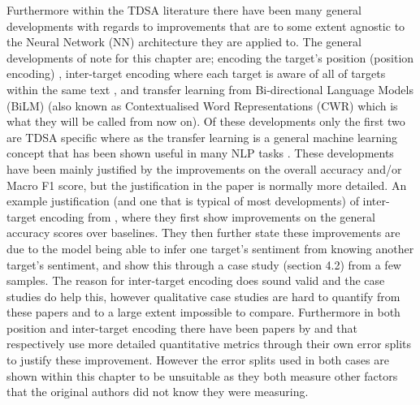 Furthermore within the TDSA literature there have been many general developments with regards to improvements that are to some extent agnostic to the Neural Network (NN) architecture they are applied to. The general developments of note for this chapter are; encoding the target's position (position encoding) \citep{gu-etal-2018-position}, inter-target encoding where each target is aware of all of targets within the same text \citep{hazarika-etal-2018-modeling}, and transfer learning from Bi-directional Language Models (BiLM) \citep{methods_sun-etal-2019-utilizing,methods_xu-etal-2019-bert} (also known as Contextualised Word Representations (CWR) which is what they will be called from now on). Of these developments only the first two are TDSA specific where as the transfer learning is a general machine learning concept that has been shown useful in many NLP tasks \citep{vectors_peters-etal-2018-deep}. These developments have been mainly justified by the improvements on the overall accuracy and/or Macro F1 score, but the justification in the paper is normally more detailed. An example justification (and one that is typical of most developments) of inter-target encoding from \citet{hazarika-etal-2018-modeling}, where they first show improvements on the general accuracy scores over baselines. They then further state these improvements are due to the model being able to infer one target's sentiment from knowing another target's sentiment, and show this through a case study (section 4.2) from a few samples. The reason for inter-target encoding does sound valid and the case studies do help this, however qualitative case studies are hard to quantify from these papers and to a large extent impossible to compare. Furthermore in both position and inter-target encoding there have been papers by \citet{he-etal-2018-exploiting} and \citet{majumder-etal-2018-iarm} that respectively use more detailed quantitative metrics through their own error splits to justify these improvement. However the error splits used in both cases are shown within this chapter to be unsuitable as they both measure other factors that the original authors did not know they were measuring.

